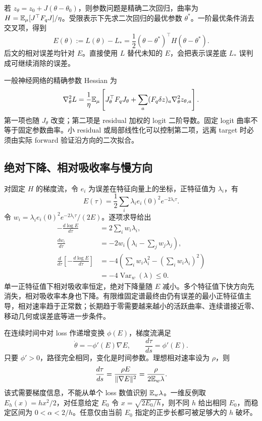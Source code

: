 若 $z_\theta=z_0+J(\theta-\theta_0)$，则参数问题是精确二次回归，曲率为 $H=\mathbb E_\mu[J^\top F_qJ]/\eta$。受限表示下先求二次回归的最优参数 $\theta^*$。一阶最优条件消去交叉项，得到
\begin{equation}
E(\theta):=L(\theta)-L_*=
\frac12(\theta-\theta^*)^\top H(\theta-\theta^*).
\end{equation}
后文的相对误差均针对 $E$。直接使用 $L$ 替代未知的 $E$，会把表示误差底 $L_*$ 误判成可继续消除的误差。

一般神经网络的精确参数 Hessian 为
\begin{equation}
\nabla_\theta^2L=
\frac1\eta\mathbb E_\mu\left[J_\theta^\top F_qJ_\theta+
\sum_a(F_q\delta z)_a\nabla_\theta^2z_{\theta,a}\right].
\end{equation}
第一项也随 $J_\theta$ 改变；第二项是 residual 加权的 logit 二阶导数。固定 logit 曲率不等于固定参数曲率。小 residual 或局部线性化可以控制第二项，远离 target 时必须由实际 forward 验证沿方向的二次拟合。

\subsection{绝对下降、相对吸收率与慢方向}

对固定 $H$ 的梯度流，令 $e_i$ 为误差在特征向量上的坐标，正特征值为 $\lambda_i$，有
\begin{equation}
E(\tau)=\frac12\sum_i\lambda_i e_i(0)^2e^{-2\lambda_i\tau}.
\end{equation}
令 $w_i=\lambda_i e_i(0)^2e^{-2\lambda_i\tau}/(2E)$。逐项求导给出
\begin{align}
-\frac{d\log E}{d\tau}&=2\sum_iw_i\lambda_i,\\
\frac{dw_i}{d\tau}&=-2w_i\left(\lambda_i-\sum_jw_j\lambda_j\right),\\
\frac{d}{d\tau}\left[-\frac{d\log E}{d\tau}\right]
&=-4\left(\sum_iw_i\lambda_i^2-\left(\sum_iw_i\lambda_i\right)^2\right)\\
&=-4\operatorname{Var}_w(\lambda)\le0.
\end{align}
单一正特征值下相对吸收率恒定，绝对下降量随 $E$ 减小。多个特征值下快方向先消失，相对吸收率本身也下降。有限维固定谱最终由仍有误差的最小正特征值主导，相对速率趋于正常数；长期趋于零需要越来越小的活跃曲率、连续谱接近零、移动几何或误差底等进一步条件。

在连续时间中对 loss 作递增变换 $\phi(E)$，梯度流满足
\begin{equation}
\dot\theta=-\phi'(E)\nabla E,\qquad
\frac{d\tau}{ds}=\phi'(E).
\end{equation}
只要 $\phi'>0$，路径完全相同，变化是时间参数。理想相对速率设为 $\rho$，则
\begin{equation}
\frac{d\tau}{ds}=\frac{\rho E}{\|\nabla E\|^2}
=\frac{\rho}{2\mathbb E_w\lambda}.
\end{equation}
该式需要梯度信息，不能从单个 loss 数值识别 $\mathbb E_w\lambda$。一维反例取 $E_h(x)=hx^2/2$，对任意给定 $E_0$ 令 $x=\sqrt{2E_0/h}$，则不同 $h$ 给出相同 $E_0$，而稳定区间为 $0<\alpha<2/h$。任意仅由当前 $E_0$ 指定的正步长都可被足够大的 $h$ 破坏。

